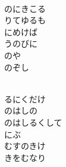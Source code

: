 \documentclass[10pt,b5j]{tarticle} %
\begin{document}
\begin{enumerate}
\begin{minipage}[c]{\blocksize}
    \end{minipage}
    \begin{minipage}[c]{\blocksize}
        
        \vspace{\linespace}
        \item~\\
        のにきこる\\
        りてゆるも\\
        にめけば\\
        うのびに\\
        のや\\
        のぞし
        
    \end{minipage}
    \begin{minipage}[c]{\blocksize}
        
        \vspace{\linespace}
        \item~\\
        るにくだけ\\
        のはしの\\
        のはしるくして\\
        にぶ\\
        むすのきけ\\
        きをむなり
    
    \end{minipage}
\end{enumerate} %
\end{document}
